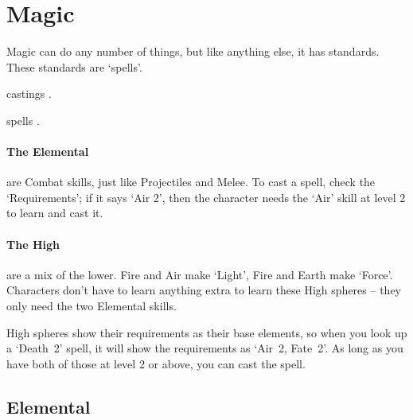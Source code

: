 \chapter[Chamber of Magic]{Magic}
\label{spellsChapter}
\toggletrue{examplecharacter}

\begin{multicols}{2}

\noindent
Magic can do any number of things, but like anything else, it has standards.
These standards are `spells'.

\Glspl{casting}
.

\Glspl{spell}
.

\subsubsection{The Elemental }
are Combat \glspl{skill}, just like Projectiles and Melee.
To cast a spell, check the `Requirements'; if it says `Air 2', then the character needs the `Air' \gls{skill} at level 2 to learn and cast it.

\subsubsection{The High }
are a mix of the lower.
Fire and Air make `Light', Fire and Earth make `Force'.
Characters don't have to learn anything extra to learn these High \glspl{sphere} -- they only need the two Elemental \glspl{skill}.

High \glspl{sphere} show their requirements as their base elements, so when you look up a `Death~2' spell, it will show the requirements as `Air~2, Fate~2'.
As long as you have both of those at level 2 or above, you can cast the spell.

\end{multicols}


\section{Elemental }

